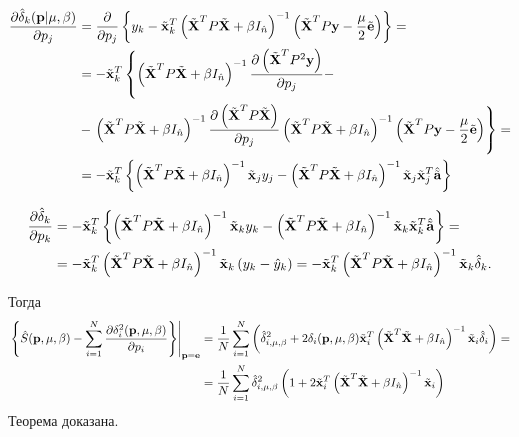 \begin{Proof}

\begin{align*}
	\dd{\hat\delta_k(\mb p \cond \lams)}{p_j}
	&= 	\dd{}{p_j}
		\fbr{
			y_k - \tilde {\mb x}_k^T \inv{\tilde{\mb X}^T P\tilde{\mb X} + \beta I_{\hat n}}
			\cbr{\tilde{\mb X}^T P \mb y -\frac\mu2\tilde{\mb e}}
		} = \\
	&= - \tilde {\mb x}_k^T
	\left\{
		\inv{\tilde{\mb X}^T P\tilde{\mb X} + \beta I_{\hat n}}
	  	\dd{\cbr{\tilde{\mb X}^T P^2 \mb y}}{p_j} -
	  	\right. \\
	&- 	\left.
	   	\inv{\tilde{\mb X}^T P\tilde{\mb X} + \beta I_{\hat n}}
		\dd{\cbr{\tilde{\mb X}^T P\tilde{\mb X}}}{p_j}
		\inv{\tilde{\mb X}^T P\tilde{\mb X} + \beta I_{\hat n}}
		\cbr{\tilde{\mb X}^T P \mb y -\frac\mu2\tilde{\mb e}}
	\right\} = \\
	&= - \tilde {\mb x}_k^T
	\fbr{
		\inv{\tilde{\mb X}^T P\tilde{\mb X} + \beta I_{\hat n}}
		\tilde{\mb x}_jy_j
		-
		\inv{\tilde{\mb X}^T P\tilde{\mb X} + \beta I_{\hat n}}
		\tilde{\mb x}_j \tilde{\mb x}^T_j
		\besta
	}
\end{align*}

\begin{align*}
	\dd{\hat\delta_k}{p_k}
	&= - \tilde {\mb x}_k^T
	\fbr{
		\inv{\tilde{\mb X}^T P\tilde{\mb X} + \beta I_{\hat n}}
		\tilde{\mb x}_ky_k
		-
		\inv{\tilde{\mb X}^T P\tilde{\mb X} + \beta I_{\hat n}}
		\tilde{\mb x}_k \tilde{\mb x}^T_k
		\besta
	} = \\
	&= -\tilde {\mb x}_k^T
		\inv{\tilde{\mb X}^T P\tilde{\mb X} + \beta I_{\hat n}}
		\tilde{\mb x}_k \cbr{y_k - \hat y_k}
	= - \tilde {\mb x}_k^T
		\inv{\tilde{\mb X}^T P\tilde{\mb X} + \beta I_{\hat n}}
		\tilde{\mb x}_k \hat \delta_k.
\end{align*}

Тогда
\begin{align*}
	\left.\fbr{
		\hat S(\mb p, \lams)
	- 	\suml_{i=1}^N\dd{\delta_i^2(\mb p, \lams)}{p_i}
	}\right|_{\mb p=\mb e}
	&= 	\frac1N\suml_{i=1}^N
		\cbr{
			\hat \delta_{i, \lams}^2
		+ 	2 \delta_i(\mb p, \lams)
			\tilde {\mb x}_i^T
			\inv{\tilde{\mb X}^T \tilde{\mb X} + \beta I_{\hat n}}
			\tilde{\mb x}_i \hat \delta_i
		} = \\
	&= 	\frac1N\suml_{i=1}^N
			\hat \delta_{i, \lams}^2
		\cbr{
			1
		+ 	2
			\tilde {\mb x}_i^T
			\inv{\tilde{\mb X}^T \tilde{\mb X} + \beta I_{\hat n}}
			\tilde{\mb x}_i
		}
\end{align*}
Теорема доказана.
\end{Proof}

